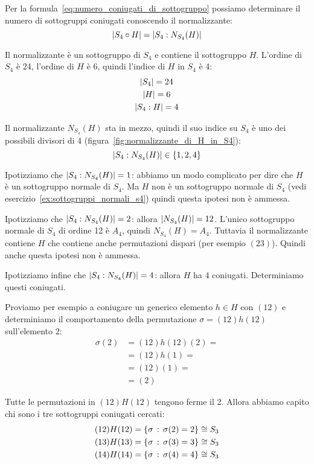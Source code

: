 \begin{soluzione}
	Per la formula~\eqref{eq:numero_coniugati_di_sottogruppo} possiamo determinare il numero di sottogruppi coniugati
	conoscendo il normalizzante:
	\begin{equation*}
		\lvert S_4 \circ H \rvert = \lvert S_4:N_{S_4}(H) \rvert
	\end{equation*}

	Il normalizzante è un sottogruppo di $S_4$ e contiene il sottogruppo $H$.
	L'ordine di $S_4$ è 24, l'ordine di $H$ è 6, quindi l'indice di $H$ in $S_4$ è 4:
	\begin{gather*}
		\lvert S_4 \rvert = 24 \\
		\lvert H \rvert = 6 \\
		\lvert S_4:H \rvert = 4
	\end{gather*}

	Il normalizzante $N_{S_4}(H)$ sta in mezzo, quindi il suo indice su $S_4$ è uno dei possibili divisori di 4
	(figura~\ref{fig:normalizzante_di_H_in_S4}):
	\begin{equation*}
		\lvert S_4:N_{S_4}(H) \rvert \in \{1, 2, 4\}
	\end{equation*}

	Ipotizziamo che $\lvert S_4:N_{S_4}(H) \rvert = 1$: abbiamo un modo complicato per dire che $H$ è un sottogruppo normale di
	$S_4$.
	Ma $H$ non è un sottogruppo normale di $S_4$ (vedi esercizio~\ref{ex:sottogruppi_normali_s4}) quindi questa ipotesi
	non è ammessa.

	Ipotizziamo che $\lvert S_4:N_{S_4}(H) \rvert = 2$: allora $\lvert N_{S_4}(H) \rvert = 12$.
	L'unico sottogruppo normale di $S_4$ di ordine 12 è $A_4$, quindi $N_{S_4}(H) = A_4$.
	Tuttavia il normalizzante contiene $H$ che contiene anche permutazioni dispari (per esempio $(23)$).
	Quindi anche questa ipotesi non è ammessa.

	Ipotizziamo infine che $\lvert S_4:N_{S_4}(H) \rvert = 4$: allora $H$ ha 4 coniugati.
	Determiniamo questi coniugati.

	Proviamo per esempio a coniugare un generico elemento $h \in H$ con $(12)$ e determiniamo il comportamento della
	permutazione $\sigma = (12)h(12)$ sull'elemento 2:
	\begin{align*}
		\sigma(2) &= (12)h(12)(2) = \\
		&= (12)h(1) = \\
		&= (12)(1) = \\
		&= (2)
	\end{align*}

	Tutte le permutazioni in $(12)H(12)$ tengono ferme il 2.
	Allora abbiamo capito chi sono i tre sottogruppi coniugati cercati:
	\begin{gather*}
		(12)H(12) = \{\sigma \,:\, \sigma(2) = 2\} \cong S_3 \\
		(13)H(13) = \{\sigma \,:\, \sigma(3) = 3\} \cong S_3 \\
		(14)H(14) = \{\sigma \,:\, \sigma(4) = 4\} \cong S_3
	\end{gather*}

\end{soluzione}

